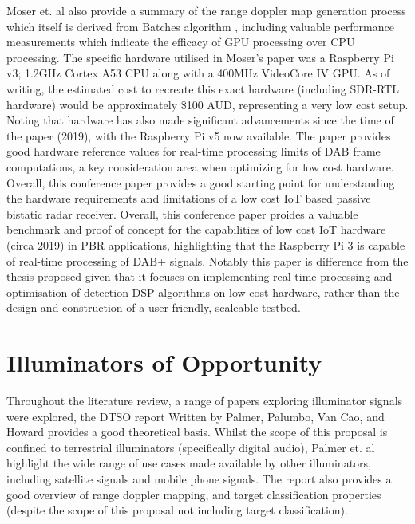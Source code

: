 \par \vspace{0.5cm} 
\noindent Moser et. al also provide a summary of the range doppler map generation process which itself is derived from Batches algorithm \cite{DSPfm}, including valuable performance measurements which indicate the efficacy of GPU processing over CPU processing.  The specific hardware utilised in Moser's paper was a Raspberry Pi v3; 1.2GHz Cortex A53 CPU along with a 400MHz VideoCore IV GPU. As of writing, the estimated cost to recreate this exact hardware (including SDR-RTL hardware) would be approximately \$100 AUD, representing a very low cost setup. Noting that hardware has also made significant advancements since the time of the paper (2019), with the Raspberry Pi v5 now available. The paper provides good hardware reference values for real-time processing limits of DAB frame computations, a key consideration area when optimizing for low cost hardware. Overall, this conference paper provides a good starting point for understanding the hardware requirements and limitations of a low cost IoT based passive bistatic radar receiver. Overall, this conference paper proides a valuable benchmark and proof of concept for the capabilities of low cost IoT hardware (circa 2019) in PBR applications, highlighting that the Raspberry Pi 3 is capable of real-time processing of DAB+ signals. Notably this paper is difference from the thesis proposed given that it focuses on implementing real time processing and optimisation of detection DSP algorithms on low cost hardware, rather than the design and construction of a user friendly, scaleable testbed.

\section{Illuminators of Opportunity}

Throughout the literature review, a range of papers exploring illuminator signals were explored, the DTSO report Written by Palmer, Palumbo, Van Cao, and Howard provides a good theoretical basis. Whilst the scope of this proposal is confined to terrestrial illuminators (specifically digital audio), Palmer et. al highlight the wide range of use cases made available by other illuminators, including satellite signals and mobile phone signals. The report also provides a good overview of range doppler mapping, and target classification properties (despite the scope of this proposal not including target classification).

